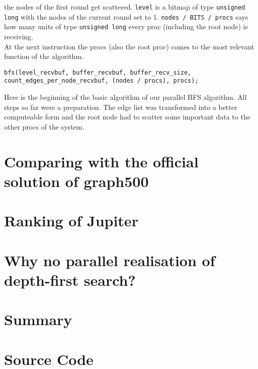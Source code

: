 \documentclass[12pt,a4paper]{article}
\begin{document}
the nodes of the first round get scattered. \lstinline{level} is a bitmap of type \lstinline{unsigned long} with the nodes of the current round set to 1. \lstinline{nodes / BITS / procs} says how many units of type \lstinline{unsigned long} every proc (including the root node) is receiving. \\
At the next instruction the procs (also the root proc) comes to the most relevant function of the algorithm.
\begin{lstlisting}
bfs(level_recvbuf, buffer_recvbuf, buffer_recv_size, count_edges_per_node_recvbuf, (nodes / procs), procs);
\end{lstlisting}
Here is the beginning of the basic algorithm of our parallel BFS algorithm. All steps so far were a preparation. The edge list was transformed into a better computeable form and the root node had to scatter some important data to the other procs of the system.

\section{Comparing with the official solution of graph500}
\label{sec:Comparing}

\section{Ranking of Jupiter}
\label{sec:ranking}

\section{Why no parallel realisation of depth-first search?}
\label{sec:depth-first search}

\section{Summary}
\label{sec:summary}

\clearpage

\nocite{*}



\appendix
\section{Source Code}
\label{sec:sourcecode}

\clearpage

\clearpage


\clearpage
\end{document}
